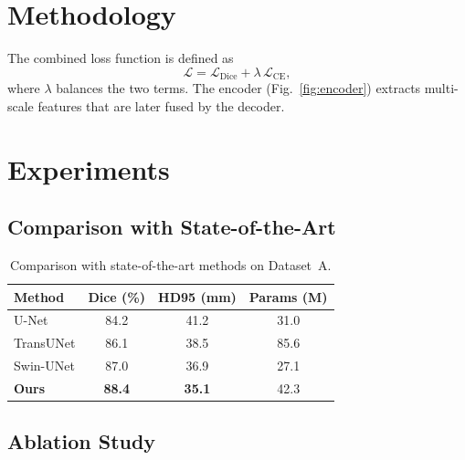 \documentclass[journal,12pt,draftclsnofoot,onecolumn]{IEEEtran}
\begin{document}
\section{Methodology}
The combined loss function is defined as
\begin{equation}
\mathcal{L} = \mathcal{L}_{\text{Dice}} + \lambda\,\mathcal{L}_{\text{CE}},
\label{eq:loss}
\end{equation}
where $\lambda$ balances the two terms.
The encoder (Fig.~\ref{fig:encoder}) extracts multi-scale features that
are later fused by the decoder.
\lipsum[4-5]

\section{Experiments}

\subsection{Comparison with State-of-the-Art}
\lipsum[6]

\begin{table}[H]
\centering
\caption{Comparison with state-of-the-art methods on Dataset~A.}
\label{tab:sota}
\begin{tabular}{lccc}
\toprule
Method         & Dice (\%)     & HD95 (mm)     & Params (M) \\
\midrule
U-Net          & 84.2          & 41.2          & 31.0       \\
TransUNet      & 86.1          & 38.5          & 85.6       \\
Swin-UNet      & 87.0          & 36.9          & 27.1       \\
\textbf{Ours}  & \textbf{88.4} & \textbf{35.1} & 42.3       \\
\bottomrule
\end{tabular}
\end{table}

\subsection{Ablation Study}
\lipsum[7]
\end{document}
